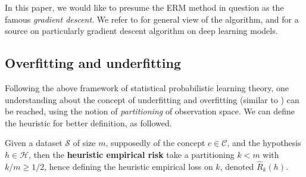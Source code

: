 \documentclass[10pt]{article} %
\begin{document}
In this paper, we would like to presume the ERM method in question as the famous \textit{gradient descent}. We refer to \cite{achlioptas_stochastic_nodate,ruder_overview_2017} for general view of the algorithm, and \cite{zhang_gradient_2019} for a source on particularly gradient descent algorithm on deep learning models. 

\subsection{Overfitting and underfitting}

Following the above framework of statistical probabilistic learning theory, one understanding about the concept of underfitting and overfitting (similar to \cite{gareth_james_introduction_2013}) can be reached, using the notion of \textit{partitioning} of observation space. We can define the heuristic for better definition, as followed. 

\begin{definition}
  Given a dataset $\mathcal{S}$ of size $m$, supposedly of the concept $c\in \mathcal{C}$, and the hypothesis $h\in \mathcal{H}$, then the \textbf{heuristic empirical risk} take a partitioning $k<m$ with $k/m\geq 1/2$, hence defining the heuristic empirical loss on $k$, denoted $\hat{R}_{k}(h)$. 
\end{definition}
\end{document}

